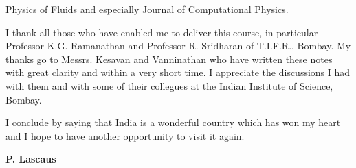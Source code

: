 Physics of Fluids and especially Journal of Computational Physics.

I thank all those who have enabled me to deliver this course, in
particular Professor K.G. Ramanathan and Professor R. Sridharan of
T.I.F.R., Bombay. My thanks go to Messrs. Kesavan and Vanninathan who
have written these notes with great clarity and within a very short
time. I appreciate the discussions I had with them and with some of
their collegues at the Indian Institute of Science, Bombay.

I conclude by saying that India is a wonderful country which has won
my heart and I hope to have another opportunity to visit it again.
\bigskip

\hfill {\large\bf P. Lascaus}

